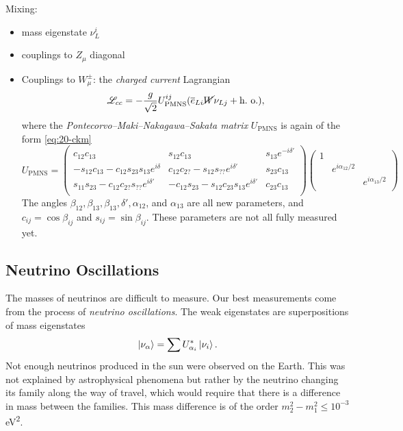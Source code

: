 Mixing:
\begin{itemize}
  \item mass eigenstate $\nu_L^{i}$
  \item couplings to $Z_{\mu}$ diagonal
  \item Couplings to $W_{\mu}^\pm$: the \emph{charged current} Lagrangian
    \begin{equation}
      \mathscr{L}_{cc} = -\frac{g}{\sqrt{2}} U_{\text{PMNS}}^{ij} (\overline{e}{}_{L i} \cancel{W} \nu_{L j} + \text{h.~o.}),
    \end{equation}
    where the \emph{Pontecorvo--Maki--Nakagawa--Sakata matrix} $U_{\text{PMNS}}$ is again of the form \eqref{eq:20-ckm}
    \begin{equation}
      U_{\text{PMNS}} = 
      \begin{pmatrix}
       c_{12} c_{13} & s_{12} c_{13} & s_{13} e^{-i \delta'} \\
       -s_{12} c_{13} - c_{12} s_{23} s_{13} e^{i \delta} & c_{12} c_{2?} -s_{12} s_{??} e^{i \delta'} & s_{23} c_{13} \\
       s_{11} s_{23} - c_{12} c_{2?} s_{??} e^{i \delta'} & -c_{12} s_{23} - s_{12} c_{23} s_{13} e^{i \delta'} & c_{23} c_{13} \\
      \end{pmatrix}
      \begin{pmatrix}
       1 &  &  \\
        & e^{i \alpha_{12} / 2} &  \\
        &  & e^{i \alpha_{13} / 2} \\
      \end{pmatrix}
    \end{equation}
    The angles $\beta_{12}, \beta_{13}, \beta_{13}, \delta', \alpha_{12}$, and $\alpha_{13}$ are all new parameters, and $c_{ij} = \cos \beta_{ij}$ and $s_{ij} = \sin \beta_{ij}$.  These parameters are not all fully measured yet.
\end{itemize}

\subsection*{Neutrino Oscillations}%

The masses of neutrinos are difficult to measure. Our best measurements come from the process of \emph{neutrino oscillations}.
The weak eigenstates are superpositions of mass eigenstates
\begin{equation}
  \ket{\nu_\alpha} = \sum U^*_{\alpha_{i}} \ket{\nu_i}.
\end{equation}
Not enough neutrinos produced in the sun were observed on the Earth. This was not explained by astrophysical phenomena but rather by the neutrino changing its family along the way of travel, which would require that there is a difference in mass between the families.
This mass difference is of the order $m_2^2 - m_1^2 \leq 10^{-3}$eV\textsuperscript{2}.
